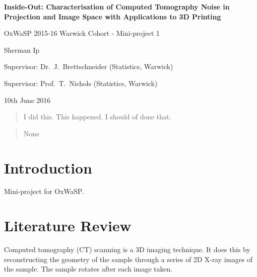 \documentclass[12pt]{report}
\begin{document}
\begin{titlepage}
\centering
\vspace*{1cm}
        
        \LARGE
        \textbf{Inside-Out: Characterisation of Computed Tomography Noise in Projection and Image Space with Applications to 3D Printing}
        
		\large        
        
        \vspace{2cm}
        {OxWaSP 2015-16 Warwick Cohort - Mini-project 1}
        
        \vspace{1cm}
        {Sherman Ip}

        \vspace{1cm}
        {Supervisor: Dr.~J.~Brettschneider (Statistics, Warwick)}
        
        \vspace{1cm}
        {Supervisor: Prof.~T.~Nichols (Statistics, Warwick)}
        
        \vspace{1cm}
        {10th June 2016}
\end{titlepage}

\begin{abstract}
I did this. This happened. I should of done that.
\end{abstract}

\renewcommand{\abstractname}{Acknowledgements}
\begin{abstract}
None
\end{abstract}

\tableofcontents

\chapter{Introduction}
Mini-project for OxWaSP.

\chapter{Literature Review}
Computed tomography (CT) scanning is a 3D imaging technique. It does this by reconstructing the geometry of the sample through a series of 2D X-ray images of the sample. The sample rotates after each image taken.
\end{document}
